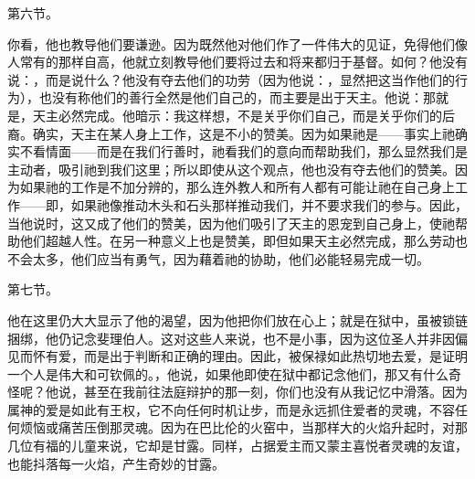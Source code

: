 第六节。\par

你看，他也教导他们要谦逊。因为既然他对他们作了一件伟大的见证，免得他们像人常有的那样自高，他就立刻教导他们要将过去和将来都归于基督。如何？他没有说：，而是说什么？他没有夺去他们的功劳（因为他说：，显然把这当作他们的行为），也没有称他们的善行全然是他们自己的，而主要是出于天主。他说：那就是，天主必然完成。他暗示：我这样想，不是关乎你们自己，而是关乎你们的后裔。确实，天主在某人身上工作，这是不小的赞美。因为如果祂是——事实上祂确实不看情面——而是在我们行善时，祂看我们的意向而帮助我们，那么显然我们是主动者，吸引祂到我们这里；所以即使从这个观点，他也没有夺去他们的赞美。因为如果祂的工作是不加分辨的，那么连外教人和所有人都有可能让祂在自己身上工作——即，如果祂像推动木头和石头那样推动我们，并不要求我们的参与。因此，当他说时，这又成了他们的赞美，因为他们吸引了天主的恩宠到自己身上，使祂帮助他们超越人性。在另一种意义上也是赞美，即但如果天主必然完成，那么劳动也不会太多，他们应当有勇气，因为藉着祂的协助，他们必能轻易完成一切。\par

第七节。 \par

他在这里仍大大显示了他的渴望，因为他把你们放在心上；就是在狱中，虽被锁链捆绑，他仍记念斐理伯人。这对这些人来说，也不是小事，因为这位圣人并非因偏见而怀有爱，而是出于判断和正确的理由。因此，被保禄如此热切地去爱，是证明一个人是伟大和可钦佩的。，他说，如果他即使在狱中都记念他们，那又有什么奇怪呢？他说，甚至在我前往法庭辩护的那一刻，你们也没有从我记忆中滑落。因为属神的爱是如此有王权，它不向任何时机让步，而是永远抓住爱者的灵魂，不容任何烦恼或痛苦压倒那灵魂。因为在巴比伦的火窑中，当那样大的火焰升起时，对那几位有福的儿童来说，它却是甘露。同样，占据爱主而又蒙主喜悦者灵魂的友谊，也能抖落每一火焰，产生奇妙的甘露。\par


